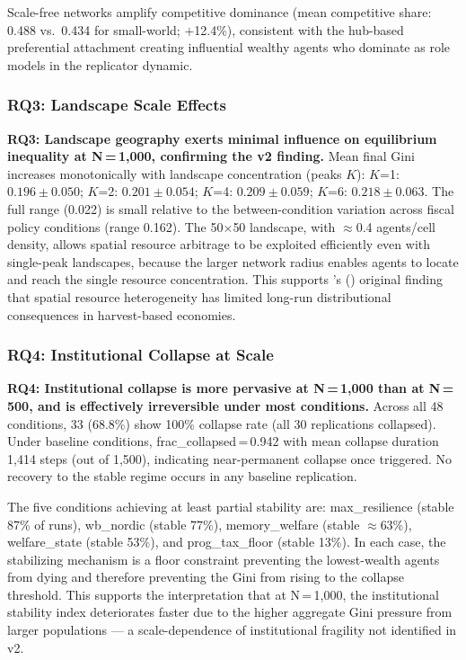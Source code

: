 \documentclass[12pt, letterpaper]{article}
\begin{document}
Scale-free networks amplify competitive dominance (mean competitive
share: 0.488 vs.\ 0.434 for small-world; $+$12.4\%), consistent with
the hub-based preferential attachment creating influential wealthy
agents who dominate as role models in the replicator dynamic.

\subsubsection{RQ3: Landscape Scale Effects}

\textbf{RQ3: Landscape geography exerts minimal influence on equilibrium
inequality at N\,=\,1,000, confirming the v2 finding.} Mean final Gini
increases monotonically with landscape concentration (peaks $K$):
$K$=1: $0.196 \pm 0.050$; $K$=2: $0.201 \pm 0.054$;
$K$=4: $0.209 \pm 0.059$; $K$=6: $0.218 \pm 0.063$.
The full range (0.022) is small relative to the between-condition
variation across fiscal policy conditions (range 0.162). The 50$\times$50
landscape, with $\approx$0.4 agents/cell density, allows spatial
resource arbitrage to be exploited efficiently even with single-peak
landscapes, because the larger network radius enables agents to locate
and reach the single resource concentration. This supports
\citeauthor{epstein1996}'s (\citeyear{epstein1996}) original finding that
spatial resource heterogeneity has limited long-run distributional
consequences in harvest-based economies.

\subsubsection{RQ4: Institutional Collapse at Scale}

\textbf{RQ4: Institutional collapse is more pervasive at N\,=\,1,000
than at N\,=\,500, and is effectively irreversible under most conditions.}
Across all 48 conditions, 33 (68.8\%) show 100\% collapse rate
(all 30 replications collapsed). Under baseline conditions,
frac\_collapsed\,=\,0.942 with mean collapse duration 1,414 steps
(out of 1,500), indicating near-permanent collapse once triggered.
No recovery to the stable regime occurs in any baseline replication.

The five conditions achieving at least partial stability are:
max\_resilience (stable 87\% of runs), wb\_nordic (stable 77\%),
memory\_welfare (stable $\approx$63\%), welfare\_state (stable 53\%),
and prog\_tax\_floor (stable 13\%). In each case, the stabilizing
mechanism is a floor constraint preventing the lowest-wealth agents
from dying and therefore preventing the Gini from rising to the
collapse threshold. This supports the interpretation that at
N\,=\,1,000, the institutional stability index deteriorates faster
due to the higher aggregate Gini pressure from larger populations
--- a scale-dependence of institutional fragility not identified in v2.
\end{document}
